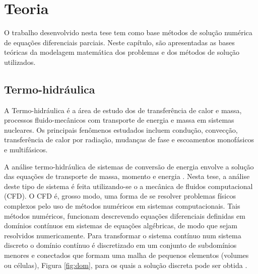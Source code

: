 \chapter{Teoria}
\label{chap:teoria}

O trabalho desenvolvido nesta tese tem como base métodos de
solução numérica de equações diferenciais parciais. Neste capítulo, são
apresentadas as bases teóricas da modelagem matemática
dos problemas e dos métodos de solução utilizados.



\section{Termo-hidráulica}
\label{sec:th}

A Termo-hidráulica é a área de estudo dos de transferência
de calor e massa, processos fluido-mecânicos com transporte de energia e
massa em sistemas nucleares. Os principais fenômenos estudados incluem condução,
convecção, transferência de calor por radiação, mudanças de fase e escoamentos
monofásicos e multifásicos.

A análise termo-hidráulica de sistemas de conversão de energia envolve a solução
das equações de transporte de massa, momento e energia \cite{Todreas2012}. Nesta
tese, a análise deste tipo de sistema é feita utilizando-se o a mecânica
de fluidos computacional (CFD). O CFD é, grosso modo, uma forma de se resolver
problemas físicos complexos pelo uso de métodos numéricos em sistemas
computacionais. Tais métodos numéricos, funcionam descrevendo equações diferenciais
definidas em domínios contínuos em sistemas de equações algébricas, de modo que
sejam resolvidos numericamente. Para transformar o sistema contínuo num sistema
discreto o domínio contínuo é discretizado em um conjunto de subdomínios menores
e conectados que formam uma malha de pequenos elementos (volumes ou células), Figura \ref{fig:dom},
para os quais a solução discreta pode ser obtida \cite{dosSantos2012}.


